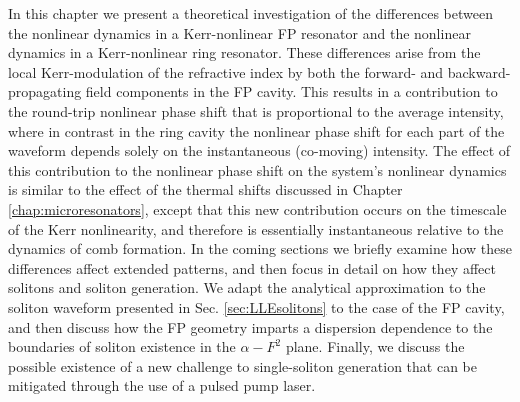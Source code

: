In this chapter we present a theoretical investigation of the differences between the nonlinear dynamics in a Kerr-nonlinear FP resonator and the nonlinear dynamics in a Kerr-nonlinear ring resonator.  These differences arise from the local Kerr-modulation of the refractive index by both the forward- and backward-propagating field components in the FP cavity. This results in a contribution to the round-trip nonlinear phase shift that is proportional to the average intensity, where in contrast in the ring cavity the nonlinear phase shift for each part of the waveform depends solely on the instantaneous (co-moving) intensity. The effect of this contribution to the nonlinear phase shift on the system's nonlinear dynamics is similar to the effect of the thermal shifts discussed in Chapter \ref{chap:microresonators}, except that this new contribution occurs on the timescale of the Kerr nonlinearity, and therefore is essentially instantaneous relative to the dynamics of comb formation. In the coming sections we briefly examine how these differences affect extended patterns, and then focus in detail on how they affect solitons and soliton generation. We adapt the analytical approximation to the soliton waveform presented in Sec. \ref{sec:LLEsolitons} to the case of the FP cavity, and then discuss how the FP geometry imparts a dispersion dependence to the boundaries of soliton existence in the $\alpha-F^2$ plane. Finally, we discuss the possible existence of a new challenge to single-soliton generation that can be mitigated through the use of a pulsed pump laser.


